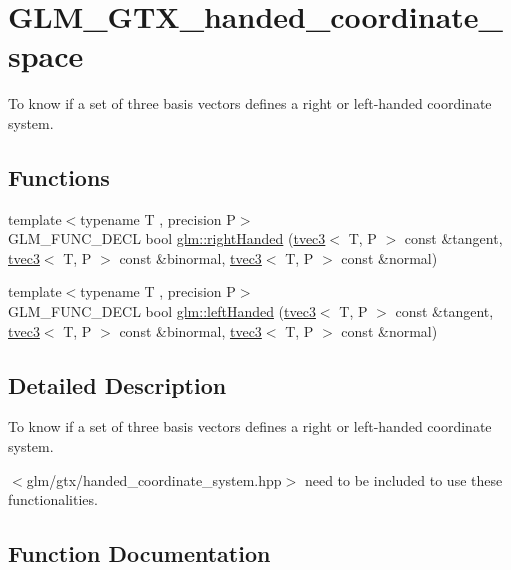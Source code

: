 \hypertarget{group__gtx__handed__coordinate__space}{}\section{G\+L\+M\+\_\+\+G\+T\+X\+\_\+handed\+\_\+coordinate\+\_\+space}
\label{group__gtx__handed__coordinate__space}


To know if a set of three basis vectors defines a right or left-\/handed coordinate system.  


\subsection*{Functions}
\begin{DoxyCompactItemize}
\item 
{\footnotesize template$<$typename T , precision P$>$ }\\G\+L\+M\+\_\+\+F\+U\+N\+C\+\_\+\+D\+E\+CL bool \hyperlink{group__gtx__handed__coordinate__space_ga17cd83888de8755c0435c589fafd3603}{glm\+::right\+Handed} (\hyperlink{structglm_1_1tvec3}{tvec3}$<$ T, P $>$ const \&tangent, \hyperlink{structglm_1_1tvec3}{tvec3}$<$ T, P $>$ const \&binormal, \hyperlink{structglm_1_1tvec3}{tvec3}$<$ T, P $>$ const \&normal)
\item 
{\footnotesize template$<$typename T , precision P$>$ }\\G\+L\+M\+\_\+\+F\+U\+N\+C\+\_\+\+D\+E\+CL bool \hyperlink{group__gtx__handed__coordinate__space_ga7425e0ebfe6a56919900a072ae1f8017}{glm\+::left\+Handed} (\hyperlink{structglm_1_1tvec3}{tvec3}$<$ T, P $>$ const \&tangent, \hyperlink{structglm_1_1tvec3}{tvec3}$<$ T, P $>$ const \&binormal, \hyperlink{structglm_1_1tvec3}{tvec3}$<$ T, P $>$ const \&normal)
\end{DoxyCompactItemize}


\subsection{Detailed Description}
To know if a set of three basis vectors defines a right or left-\/handed coordinate system. 

$<$glm/gtx/handed\+\_\+coordinate\+\_\+system.\+hpp$>$ need to be included to use these functionalities. 

\subsection{Function Documentation}
\mbox{\label{group__gtx__handed__coordinate__space_ga7425e0ebfe6a56919900a072ae1f8017}} 
